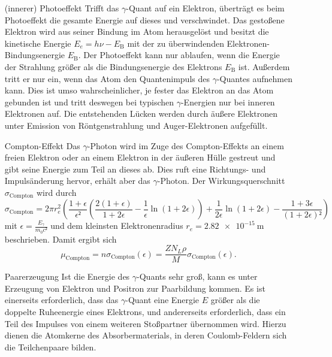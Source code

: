 \begin{itemize}
	\item[(innerer) Photoeffekt]{
Trifft das $\gamma$-Quant auf ein Elektron, überträgt es beim Photoeffekt die gesamte Energie auf dieses und verschwindet. 
Das gestoßene Elektron wird aus seiner Bindung im Atom herausgelöst und besitzt die kinetische Energie $E_e=h\nu-E_\text{B}$ mit der zu überwindenden Elektronen-Bindungsenergie $E_\text{B}$. 
Der Photoeffekt kann nur ablaufen, wenn die Energie der Strahlung größer als die Bindungsenergie des Elektrons $E_\text{B}$ ist. 
Außerdem tritt er nur ein, wenn das Atom den Quantenimpuls des $\gamma$-Quantes aufnehmen kann. 
Dies ist umso wahrscheinlicher, je fester das Elektron an das Atom gebunden ist und tritt deswegen bei typischen $\gamma$-Energien nur bei inneren Elektronen auf. 
Die entstehenden Lücken werden durch äußere Elektronen unter Emission von Röntgenstrahlung und Auger-Elektronen aufgefüllt.
}
	\item[Compton-Effekt]{
Das $\gamma$-Photon wird im Zuge des Compton-Effekts an einem freien Elektron oder an einem Elektron in der äußeren Hülle gestreut und gibt seine Energie zum Teil an dieses ab. 
Dies ruft eine Richtungs- und Impulsänderung hervor, erhält aber das $\gamma$-Photon.
Der Wirkungsquerschnitt $\sigma_\text{Compton}$ wird durch
\begin{equation}
	\sigma_\text{Compton}=2\pi  r_e^2\left(\frac{1+\epsilon}{\epsilon²}\left(\frac{2(1+\epsilon)}{1+2\epsilon}-\frac{1}{\epsilon}\ln(1+2\epsilon)\right)+\frac{1}{2\epsilon}\ln(1+2\epsilon)-\frac{1+3\epsilon}{(1+2\epsilon)²}\right)
\end{equation}
mit $\epsilon=\frac{E_{\gamma}}{m_0c²}$ und dem kleinsten Elektronenradius $r_e=\SI{2.82e-15}{\meter}$ beschrieben. 
Damit ergibt sich
\begin{equation}
	\mu_\text{Compton}=n\sigma_\text{Compton}(\epsilon)=\frac{Z N_L \rho}{M}\sigma_\text{Compton}(\epsilon).
\end{equation}
}
	\item[Paarerzeugung]{
Ist die Energie des $\gamma$-Quants sehr groß, kann es unter Erzeugung von Elektron und Positron zur Paarbildung kommen.
Es ist einerseits erforderlich, dass das $\gamma$-Quant eine Energie $E$ größer als die doppelte Ruheenergie eines Elektrons, und andererseits erforderlich, dass ein Teil des Impulses von einem weiteren Stoßpartner übernommen wird.
Hierzu dienen die Atomkerne des Absorbermaterials, in  deren Coulomb-Feldern  sich die  Teilchenpaare bilden.
}
\end{itemize}
